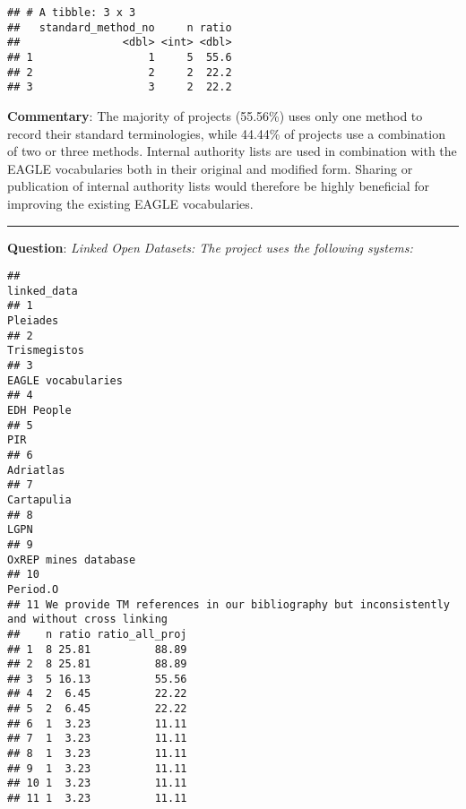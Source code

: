 \documentclass[
]{article}
\begin{document}
\begin{verbatim}
## # A tibble: 3 x 3
##   standard_method_no     n ratio
##                <dbl> <int> <dbl>
## 1                  1     5  55.6
## 2                  2     2  22.2
## 3                  3     2  22.2
\end{verbatim}

\textbf{Commentary}: The majority of projects (55.56\%) uses only one
method to record their standard terminologies, while 44.44\% of projects
use a combination of two or three methods. Internal authority lists are
used in combination with the EAGLE vocabularies both in their original
and modified form. Sharing or publication of internal authority lists
would therefore be highly beneficial for improving the existing EAGLE
vocabularies.

\begin{center}\rule{0.5\linewidth}{0.5pt}\end{center}

\textbf{Question}: \emph{Linked Open Datasets: The project uses the
following systems:}

\begin{verbatim}
##                                                                                  linked_data
## 1                                                                                   Pleiades
## 2                                                                               Trismegistos
## 3                                                                         EAGLE vocabularies
## 4                                                                                 EDH People
## 5                                                                                        PIR
## 6                                                                                  Adriatlas
## 7                                                                                 Cartapulia
## 8                                                                                       LGPN
## 9                                                                       OxREP mines database
## 10                                                                                  Period.O
## 11 We provide TM references in our bibliography but inconsistently and without cross linking
##    n ratio ratio_all_proj
## 1  8 25.81          88.89
## 2  8 25.81          88.89
## 3  5 16.13          55.56
## 4  2  6.45          22.22
## 5  2  6.45          22.22
## 6  1  3.23          11.11
## 7  1  3.23          11.11
## 8  1  3.23          11.11
## 9  1  3.23          11.11
## 10 1  3.23          11.11
## 11 1  3.23          11.11
\end{verbatim}
\end{document}

